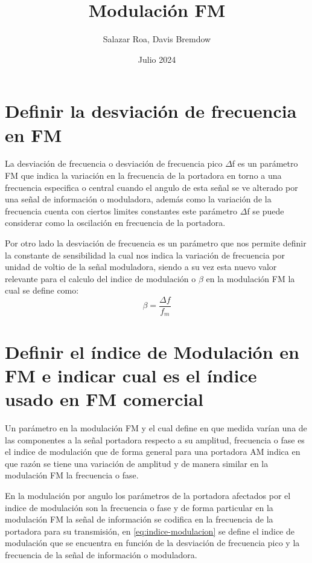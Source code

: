 \documentclass[]{article}
\title{Modulación FM}
\author{Salazar Roa, Davis Bremdow}
\date{ Julio 2024}
\begin{document}
	\maketitle
	\newpage
	
	\section{Definir la desviación de frecuencia en FM}
	La desviación de frecuencia o desviación de frecuencia pico $\Delta$f es un parámetro FM que indica la variación en la frecuencia de la portadora en torno a una frecuencia especifica o central cuando el angulo de esta señal se ve alterado por una señal de información o moduladora, además como la variación de la frecuencia cuenta con ciertos limites constantes este parámetro $\Delta$f se puede considerar como la oscilación en frecuencia de la portadora.
	
	Por otro lado la desviación de frecuencia es un parámetro que nos permite definir la constante de sensibilidad la cual nos indica la variación de frecuencia por unidad de voltio de la señal moduladora, siendo a su vez esta nuevo valor relevante para el calculo del indice de modulación o $\beta$ en la modulación FM la cual se define como: \\
	\begin{equation}
		\beta = \frac{\Delta f}{f_m} \label{eq:indice-modulacion}
	\end{equation}
	
	
	\section{Definir el índice de Modulación en FM e indicar cual es el índice usado en FM comercial}
	Un parámetro en la modulación FM y el cual define en que medida varían una de las componentes a la señal portadora respecto a su amplitud, frecuencia o fase es el indice de modulación que de forma general para una portadora AM indica en que razón se tiene una variación de amplitud y de manera similar en la modulación FM la frecuencia o fase.
	
	En la modulación por angulo los parámetros de la portadora afectados por el indice de modulación son la frecuencia o fase y de forma particular en la modulación FM la señal de información se codifica en la frecuencia de la portadora para su transmisión, en \ref{eq:indice-modulacion} se define el indice de modulación que se encuentra en función de la desviación de frecuencia pico y la frecuencia de la señal de información o moduladora.
	
\end{document}
